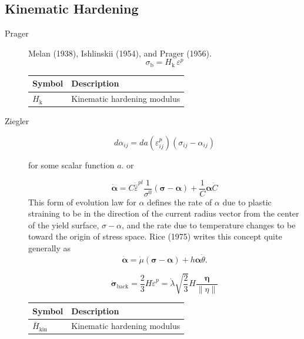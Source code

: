 \hypertarget{kinematic-hardening}{%
\subsection{Kinematic Hardening}\label{kinematic-hardening}}

\begin{description}
\item[Prager] Melan (1938), Ishlinskii (1954), and Prager (1956).
    \[
    \sigma_{\mathrm{b}} = H_\mathrm{k} \, \varepsilon^p
    \]
    \begin{longtable}[]{@{}ll@{}}
    \toprule\noalign{}
    Symbol & Description \\
    \midrule\noalign{}
    \endhead
    \bottomrule\noalign{}
    \endlastfoot
    \({H}_{\text{k}}\) & Kinematic hardening modulus \\
    \end{longtable}
\item[Ziegler]
    \[
    d \alpha_{i j}=d a\left(\varepsilon_{i j}^p\right)\left(\sigma_{i j}-\alpha_{i j}\right)
    \]
    
    for some scalar function \(a\). or
    
    \[
    \dot{\boldsymbol{\alpha}}=C \dot{\bar{\varepsilon}}^{p l} \frac{1}{\sigma^0}(\boldsymbol{\sigma}-\boldsymbol{\alpha})+\frac{1}{C} \boldsymbol{\alpha} \dot{C}
    \] 
    This form of evolution law for
    \(\alpha\) defines the rate of \(\alpha\) due to plastic straining to be
    in the direction of the current radius vector from the center of the
    yield surface, \(\sigma-\alpha\), and the rate due to temperature
    changes to be toward the origin of stress space. Rice
    (1975) writes this concept quite generally as 
    \[
    \dot{\boldsymbol{\alpha}}=\dot{\mu}(\boldsymbol{\sigma}-\boldsymbol{\alpha})+h \boldsymbol{\alpha} \dot{\theta} .
    \]
    
    \[
    \dot{\boldsymbol{\sigma}}_\text{back}
    =\frac{2}{3} H \dot{\varepsilon}^{p}
    =\dot{\lambda} \sqrt{\frac{2}{3}} H \frac{\boldsymbol{\eta}}{\|\eta\|}
    \]
    \begin{longtable}[]{@{}ll@{}}
    \toprule\noalign{}
    Symbol & Description \\
    \midrule\noalign{}
    \endhead
    \bottomrule\noalign{}
    \endlastfoot
    \(\bar{H}_{\text{kin}}\) & Kinematic hardening modulus \\
    \end{longtable}


\end{description}
